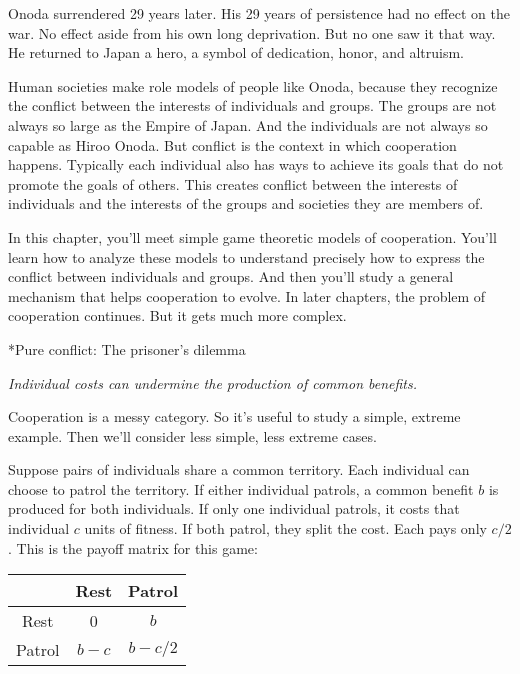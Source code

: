 \documentclass[10pt,reqno]{amsbook}
\makeatletter
\renewcommand\section{\@startsection{section}{1}
\z@{.7\linespacing\@plus\linespacing}{.5\linespacing}
{\large\bfseries\itshape}}
\numberwithin{equation}{chapter}
\newenvironment{precis}
{\noi\itshape}
{\vspace{6pt}}
\newcommand{\noi}{\noindent}
\makeatother
\begin{document}
Onoda surrendered 29 years later. His 29 years of persistence had no effect on the war. No effect aside from his own long deprivation. But no one saw it that way. He returned to Japan a hero, a symbol of dedication, honor, and altruism.

Human societies make role models of people like Onoda, because they recognize  the conflict between the interests of individuals and groups. The groups are not always so large as the Empire of Japan. And the individuals are not always so capable as Hiroo Onoda. But conflict is the context in which cooperation happens. Typically each individual also has ways to achieve its goals that do not promote the goals of others. This creates conflict between the interests of individuals and the interests of the groups and societies they are members of.

In this chapter, you'll meet simple game theoretic models of cooperation. You'll learn how to analyze these models to understand precisely how to express the conflict between individuals and groups. And then you'll study a general mechanism that helps cooperation to evolve. In later chapters, the problem of cooperation continues. But it gets much more complex.

\section*{Pure conflict: The prisoner's dilemma}

\begin{precis}Individual costs can undermine the production of common benefits.\end{precis}

Cooperation is a messy category. So it's useful to study a simple, extreme example. Then we'll consider less simple, less extreme cases.

Suppose pairs of individuals share a common territory. Each individual can choose to patrol the territory. If either individual patrols, a common benefit $b$ is produced for both individuals. If only one individual patrols, it costs that individual $c$ units of fitness. If both patrol, they split the cost. Each pays only $c/2$. This is the payoff matrix for this game:
\begin{center}
	\begin{tabular}{c|cc}
		& Rest & Patrol \\
		\hline
	Rest & 0 & $b$ \\
	Patrol & $b-c$ & $b-c/2$ 
	\end{tabular}
\end{center}
\end{document}
